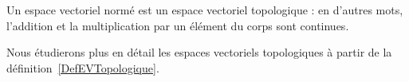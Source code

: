 \begin{corollary}
Un espace vectoriel normé est un espace vectoriel topologique : en d'autres mots, l'addition et la multiplication par un élément du corps sont continues.
\end{corollary}

Nous étudierons plus en détail les espaces vectoriels topologiques à partir de la définition~\ref{DefEVTopologique}.
